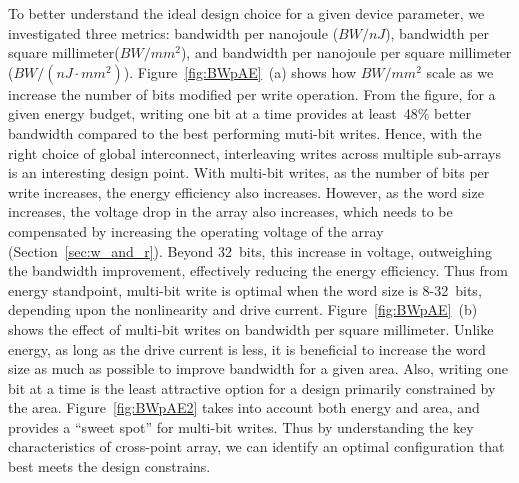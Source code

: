 To better understand the ideal design choice for a given device parameter,
we investigated three metrics: bandwidth per
nanojoule ($BW/nJ$), bandwidth per square millimeter($BW/mm^2$), and
bandwidth per nanojoule per square millimeter ($BW/(nJ\cdot mm^2)$).
Figure~\ref{fig:BWpAE}~(a) shows how $BW/mm^2$ scale as we increase the 
number of bits modified per write operation. From the figure, for a given
energy budget, writing one bit at a time provides at least~48\% better bandwidth 
compared to the best performing muti-bit writes. Hence, with the right choice
of global interconnect, interleaving writes across multiple sub-arrays is
an interesting design point. 
With multi-bit writes, as the number of bits per write increases, the energy
efficiency also increases. However, as the word size increases, the voltage
drop in the array also increases, which needs to be compensated by increasing
the operating voltage of the array (Section~\ref{sec:w_and_r}). Beyond 32~bits, this
increase in voltage, outweighing the bandwidth improvement, effectively reducing
the energy efficiency.
Thus from energy standpoint, multi-bit write is optimal when the word size is
8-32~bits, depending upon the nonlinearity and drive current. 
Figure~\ref{fig:BWpAE}~(b) shows the effect of multi-bit writes on bandwidth per
square millimeter. Unlike energy, as long as the drive current is less, 
it is beneficial to increase the word size as much as possible to improve
bandwidth for a given area. Also, writing one bit at a time is the least 
attractive option for a design primarily constrained by the area.
Figure~\ref{fig:BWpAE2} takes into account both energy and area, and 
provides a ``sweet spot'' for multi-bit writes.
Thus by understanding the key characteristics of cross-point array, we can 
identify an optimal configuration that best meets the design constrains. 

